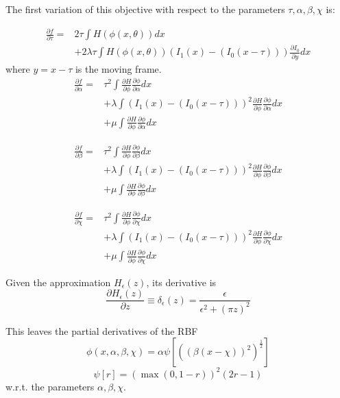 The first variation of this objective with respect to the parameters
$\tau, \alpha, \beta, \chi$ is:

\begin{eqnarray*}
\frac{\partial f}{\partial \tau} = & 2\tau\int H(\phi(x,\theta)) dx \\
& + 2\lambda\tau \int H(\phi(x,\theta))\left (I_1(x) - (I_0(x-\tau))
\right )\frac{\partial I_0}{\partial y} dx
\end{eqnarray*}
where $y = x - \tau$ is the moving frame.
\begin{eqnarray*}
\frac{\partial f}{\partial \alpha} = & \tau^2\int \frac{\partial
  H}{\partial \phi}\frac{\partial \phi}{\partial \alpha} dx \\
& + \lambda \int \left (I_1(x) - (I_0(x-\tau)) \right )^2 \frac{\partial
  H}{\partial \phi}\frac{\partial \phi}{\partial \alpha} dx \\
& + \mu \int \frac{\partial
  H}{\partial \phi}\frac{\partial \phi}{\partial \alpha} dx
\end{eqnarray*}

\begin{eqnarray*}
\frac{\partial f}{\partial \beta} = & \tau^2\int \frac{\partial
  H}{\partial \phi}\frac{\partial \phi}{\partial \beta} dx \\
& + \lambda \int \left (I_1(x) - (I_0(x-\tau)) \right )^2 \frac{\partial
  H}{\partial \phi}\frac{\partial \phi}{\partial \beta} dx \\
& + \mu \int \frac{\partial
  H}{\partial \phi}\frac{\partial \phi}{\partial \beta} dx
\end{eqnarray*}

\begin{eqnarray*}
\frac{\partial f}{\partial \chi} = & \tau^2\int \frac{\partial
  H}{\partial \phi}\frac{\partial \phi}{\partial \chi} dx \\
& + \lambda \int \left (I_1(x) - (I_0(x-\tau)) \right )^2 \frac{\partial
  H}{\partial \phi}\frac{\partial \phi}{\partial \chi} dx \\
& + \mu \int \frac{\partial
  H}{\partial \phi}\frac{\partial \phi}{\partial \chi} dx
\end{eqnarray*}

\par
Given the approximation $H_\epsilon(z)$, its derivative is
\[
\frac{\partial H_\epsilon(z)}{\partial z} \equiv \delta_\epsilon(z) = 
\frac{\epsilon}{\epsilon^2 + (\pi z)^2}
\]
\par
This leaves the partial derivatives of the RBF 
\[
\phi(x,\alpha,\beta,\chi) = \alpha \psi \left [ ((\beta(x-\chi))^2)^\frac{1}{2}\right ]
\]
\[
\psi[r] = \left ( \max{(0,1-r)} \right )^2(2r-1)
\]
w.r.t. the parameters $\alpha, \beta, \chi$.

